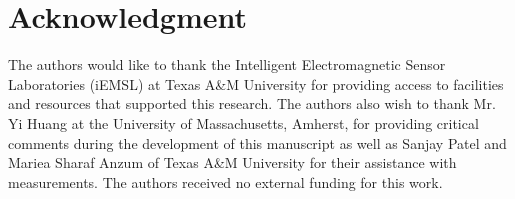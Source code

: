 \documentclass[lettersize,journal]{IEEEtran}
\begin{document}



 
%
%

\section*{Acknowledgment}
The authors would like to thank the Intelligent Electromagnetic Sensor Laboratories (iEMSL) at Texas A\&M University for providing access to facilities and resources that supported this research. The authors also wish to thank Mr. Yi Huang at the University of Massachusetts, Amherst, for providing critical comments during the development of this manuscript as well as Sanjay Patel and Mariea Sharaf Anzum of Texas A\&M University for their assistance with measurements. The authors received no external funding for this work.
\end{document}
